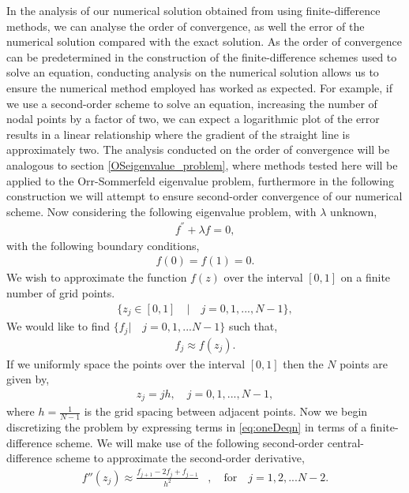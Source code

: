 \documentclass[a4paper, 12pt, twoside, openright]{article}
\numberwithin{equation}{section}
\begin{document}
In the analysis of our numerical solution obtained from using finite-difference methods, we can analyse the order of convergence, as well the error of the numerical solution compared with the exact solution. As the order of convergence can be predetermined in the construction of the finite-difference schemes used to solve an equation, conducting analysis on the numerical solution allows us to ensure the numerical method employed has worked as expected. For example, if we use a second-order scheme to solve an equation, increasing the number of nodal points by a factor of two, we can expect a logarithmic plot of the error results in a linear relationship where the gradient of the straight line is approximately two. The analysis conducted on the order of convergence will be analogous to section \ref{OSeigenvalue_problem}, where methods tested here will be applied to the Orr-Sommerfeld eigenvalue problem, furthermore in the following construction we will attempt to ensure second-order convergence of our numerical scheme. Now considering the following eigenvalue problem, with $\lambda$ unknown,
\begin{align}
f^{''} + \lambda f = 0,\label{eq:oneDeqn}
\end{align}
with the following boundary conditions,
\begin{align}
f(0)=f(1)=0. 
\end{align}
We wish to approximate the function $f(z)$ over the interval $[0,1]$ on a finite number of grid points. 
\begin{align}
\{z_j  \in [0,1] \quad | \quad j = 0,1,...,N-1 \},
\end{align}
We would like to find $\{ f_j |\quad j=0,1,... N-1 \}$ such that,
\begin{align}
f_j \approx f(z_j).
\end{align}
If we uniformly space the points over the interval $[0,1]$ then the $N$ points are given by,
\begin{align}
z_j = jh, \quad j = 0,1,...,N-1, 
\end{align}
where $h = \frac{1}{N-1} $ is the grid spacing between adjacent points. Now we begin discretizing the problem by expressing terms in \eqref{eq:oneDeqn} in terms of a finite-difference scheme. We will make use of the following second-order central-difference scheme to approximate the second-order derivative,
\begin{align}
f''(z_j) \approx \frac{f_{j+1}-2f_j+f_{j-1}}{h^2}&, \quad \text{for} \quad j=1,2,...N-2.
\end{align}
\end{document}
